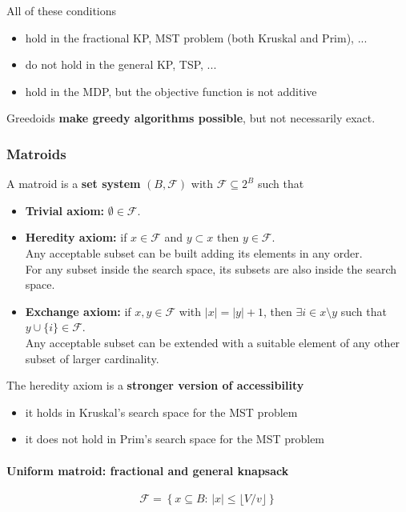 All of these conditions
\begin{itemize}
	\item hold in the fractional KP, MST problem (both Kruskal and Prim), ...
	\item do not hold in the general KP, TSP, ...
	\item hold in the MDP, but the objective function is not additive
\end{itemize}
Greedoids \textbf{make greedy algorithms possible}, but not necessarily exact.\\

\newpage

\subsubsection{Matroids}
A matroid is a \textbf{set system} $(B, \mathcal{F})$ with $\mathcal{F} \subseteq 2^B$ such that
\begin{itemize}
	\item \textbf{Trivial axiom:} $\emptyset \in \mathcal{F}$.\\
	
	\item \textbf{Heredity axiom:} if $x \in \mathcal{F}$ and $y \subset x$ then $y \in \mathcal{F}$.\\
	Any acceptable subset can be built adding its elements in any order.\\
	For any subset inside the search space, its subsets are also inside the search space.\\
	
	\item \textbf{Exchange axiom:} if $x, y \in \mathcal{F}$ with $|x| = |y| + 1$, then $\exists i \in x \setminus y$ such that $y \cup \{i\} \in \mathcal{F}$.\\
	Any acceptable subset can be extended with a suitable element of any other subset of larger cardinality.\\
\end{itemize}

The heredity axiom is a \textbf{stronger version of accessibility}
\begin{itemize}
	\item it holds in Kruskal's search space for the MST problem
	\item it does not hold in Prim’s search space for the MST problem
\end{itemize}


\paragraph{Uniform matroid: fractional and general knapsack}
$$ \mathcal{F} = \left\{x \subseteq B : \, |x| \leq \lfloor V / v \rfloor \right\}$$

